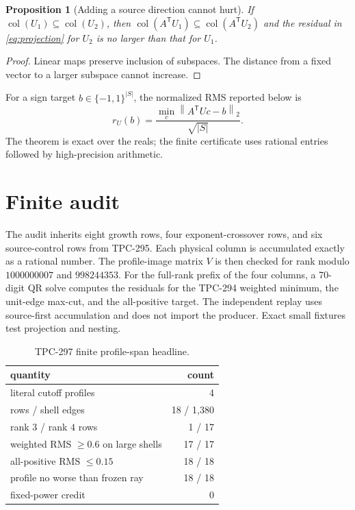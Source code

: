 \documentclass[10pt]{article}
\newtheorem{proposition}{Proposition}
\newcommand{\norm}[1]{\left\lVert #1\right\rVert}
\begin{document}
\begin{proposition}[Adding a source direction cannot hurt]
If $\operatorname{col}(U_1)\subseteq\operatorname{col}(U_2)$, then
$\operatorname{col}(A^{\mathsf T}U_1)\subseteq
\operatorname{col}(A^{\mathsf T}U_2)$ and the residual in
\eqref{eq:projection} for $U_2$ is no larger than that for $U_1$.
\end{proposition}

\begin{proof}
Linear maps preserve inclusion of subspaces.  The distance from a fixed
vector to a larger subspace cannot increase.
\end{proof}

For a sign target $b\in\{-1,1\}^{|S|}$, the normalized RMS reported below is
\[
 r_U(b)=\frac{\min_c\norm{A^{\mathsf T}Uc-b}_2}{\sqrt{|S|}}.
\]
The theorem is exact over the reals; the finite certificate uses rational
entries followed by high-precision arithmetic.

\section{Finite audit}

The audit inherits eight growth rows, four exponent-crossover rows, and six
source-control rows from TPC-295.  Each physical column is accumulated
exactly as a rational number.  The profile-image matrix $V$ is then checked
for rank modulo $1000000007$ and $998244353$.  For the full-rank prefix of
the four columns, a 70-digit QR solve computes the residuals for the
TPC-294 weighted minimum, the unit-edge max-cut, and the all-positive target.
The independent replay uses source-first accumulation and does not import
the producer.  Exact small fixtures test projection and nesting.

\begin{table}[ht]
\centering
\small
\caption{TPC-297 finite profile-span headline.}
\label{tab:headline}
\begin{tabular}{@{}lr@{}}
\toprule
quantity & count\\
\midrule
literal cutoff profiles & 4\\
rows / shell edges & 18 / 1,380\\
rank $3$ / rank $4$ rows & 1 / 17\\
weighted RMS $\geq0.6$ on large shells & 17 / 17\\
all-positive RMS $\leq0.15$ & 18 / 18\\
profile no worse than frozen ray & 18 / 18\\
fixed-power credit & 0\\
\bottomrule
\end{tabular}
\end{table}
\end{document}

